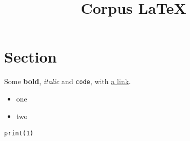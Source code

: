 \documentclass{article}
\title{Corpus LaTeX}
\begin{document}
\maketitle
\section{Section}
Some \textbf{bold}, \emph{italic} and \texttt{code}, with \href{https://example.org}{a link}.
\begin{itemize}
\item one
\item two
\end{itemize}
\begin{verbatim}
print(1)
\end{verbatim}
\end{document}
